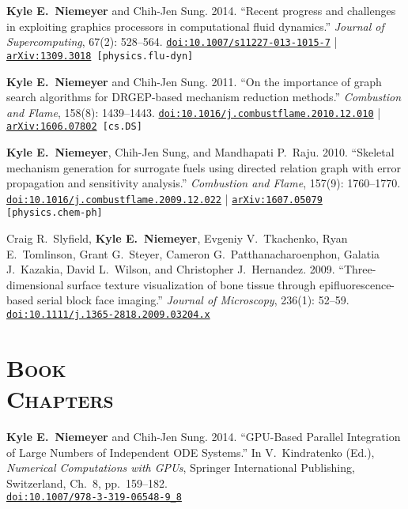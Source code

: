 \documentclass[margin,line,11pt]{res}
\makeatletter
\newlength{\bibhang}
\newlength{\bibsep}
 {\@listi \global\bibsep\itemsep \global\advance\bibsep by\parsep}
\newenvironment{bibenum*}
  {\renewcommand\labelenumi{\theenumi.}%
   \etaremune[
     topsep=0pt,
     itemsep=\bibsep,
     parsep=0pt,partopsep=0pt,
     itemindent=-\bibhang,
     leftmargin={\bibhang+\widthof{[999]}}]}
  {\endetaremune}
\newcommand*{\doi}[1]{\href{http://dx.doi.org/#1}{\nolinkurl{doi:#1}}}
\makeatother
\begin{document}
\begin{resume}
\begin{bibenum*}
\item \textbf{Kyle E.\ Niemeyer} and Chih-Jen Sung.
2014.
``Recent progress and challenges in exploiting graphics processors in computational fluid dynamics.''
\emph{Journal of Supercomputing}, 67(2): 528--564.
\doi{10.1007/s11227-013-1015-7} |
{\tt \href{http://arxiv.org/abs/1309.3018}{arXiv:1309.3018} [physics.flu-dyn]}

\item \textbf{Kyle E.\ Niemeyer} and Chih-Jen Sung.
2011.
``On the importance of graph search algorithms for DRGEP-based mechanism reduction methods.''
\emph{Combustion and Flame}, 158(8): 1439--1443.
\doi{10.1016/j.combustflame.2010.12.010} |
{\tt \href{http://arxiv.org/abs/1606.07802}{arXiv:1606.07802} [cs.DS]}

\item \textbf{Kyle E.\ Niemeyer}, Chih-Jen Sung, and Mandhapati P.\ Raju.
2010.
``Skeletal mechanism generation for surrogate fuels using directed relation graph with error propagation and sensitivity analysis.''
\emph{Combustion and Flame}, 157(9): 1760--1770. \\
\doi{10.1016/j.combustflame.2009.12.022} |
{\tt \href{http://arxiv.org/abs/1607.05079}{arXiv:1607.05079} [physics.chem-ph]}

\item Craig R.\ Slyfield, \textbf{Kyle E.\ Niemeyer}, Evgeniy V.\ Tkachenko, Ryan E.\ Tomlinson, Grant G.\ Steyer, Cameron G.\ \mbox{Patthanacharoenphon}, Galatia J.\ Kazakia, David L.\ Wilson, and Christopher J.\ Hernandez.
2009.
``Three-dimensional surface texture visualization of bone tissue through epifluorescence-based serial block face imaging.''
\emph{Journal of Microscopy}, 236(1): 52--59.
\doi{10.1111/j.1365-2818.2009.03204.x}

\end{bibenum*}

\section{\textsc{Book\\Chapters}}

\begin{bibenum*}

\item \textbf{Kyle E.\ Niemeyer} and Chih-Jen Sung.
2014.
``GPU-Based Parallel Integration of Large Numbers of Independent ODE Systems.''
In V.\ Kindratenko (Ed.), \emph{Numerical Computations with GPUs}, Springer International Publishing, Switzerland, Ch.\ 8, pp.\ 159--182. \\
\doi{10.1007/978-3-319-06548-9_8}


\end{bibenum*}
\end{resume}
\end{document}

